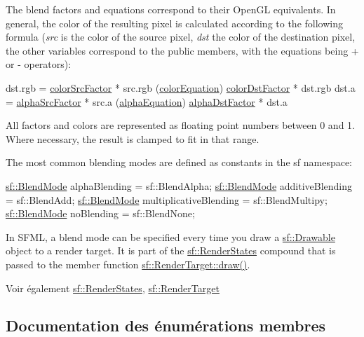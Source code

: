 The blend factors and equations correspond to their Open\+GL equivalents. In general, the color of the resulting pixel is calculated according to the following formula ({\itshape src} is the color of the source pixel, {\itshape dst} the color of the destination pixel, the other variables correspond to the public members, with the equations being + or -\/ operators)\+: 
\begin{DoxyCode}
dst.rgb = \hyperlink{structsf_1_1BlendMode_a32d1a55dbfada86a06d9b881dc8ccf7b}{colorSrcFactor} * src.rgb (\hyperlink{structsf_1_1BlendMode_aed12f06eb7f50a1b95b892b0964857b1}{colorEquation}) 
      \hyperlink{structsf_1_1BlendMode_adee68ee59e7f1bf71d12db03d251104d}{colorDstFactor} * dst.rgb
dst.a   = \hyperlink{structsf_1_1BlendMode_aa94e44f8e1042a7357e8eff78c61a1be}{alphaSrcFactor} * src.a   (\hyperlink{structsf_1_1BlendMode_a68f5a305e0912946f39ba6c9265710c4}{alphaEquation}) 
      \hyperlink{structsf_1_1BlendMode_aaf85b6b7943181cc81745569c4851e4e}{alphaDstFactor} * dst.a
\end{DoxyCode}
 All factors and colors are represented as floating point numbers between 0 and 1. Where necessary, the result is clamped to fit in that range.

The most common blending modes are defined as constants in the sf namespace\+:


\begin{DoxyCode}
\hyperlink{structsf_1_1BlendMode}{sf::BlendMode} alphaBlending          = sf::BlendAlpha;
\hyperlink{structsf_1_1BlendMode}{sf::BlendMode} additiveBlending       = sf::BlendAdd;
\hyperlink{structsf_1_1BlendMode}{sf::BlendMode} multiplicativeBlending = sf::BlendMultipy;
\hyperlink{structsf_1_1BlendMode}{sf::BlendMode} noBlending             = sf::BlendNone;
\end{DoxyCode}


In S\+F\+ML, a blend mode can be specified every time you draw a \hyperlink{classsf_1_1Drawable}{sf\+::\+Drawable} object to a render target. It is part of the \hyperlink{classsf_1_1RenderStates}{sf\+::\+Render\+States} compound that is passed to the member function \hyperlink{classsf_1_1RenderTarget_a12417a3bcc245c41d957b29583556f39}{sf\+::\+Render\+Target\+::draw()}.

\begin{DoxySeeAlso}{Voir également}
\hyperlink{classsf_1_1RenderStates}{sf\+::\+Render\+States}, \hyperlink{classsf_1_1RenderTarget}{sf\+::\+Render\+Target} 
\end{DoxySeeAlso}


\subsection{Documentation des énumérations membres}
\mbox{\label{structsf_1_1BlendMode_a7bce470e2e384c4f9c8d9595faef7c32}} 
